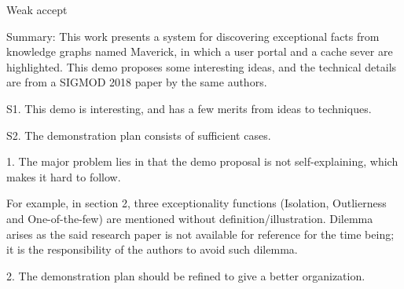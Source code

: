 
Weak accept

Summary: 
This work presents a system for discovering exceptional facts from knowledge graphs named Maverick, in which a user portal and a cache sever are highlighted.
This demo proposes some interesting ideas, and the technical details are from a SIGMOD 2018 paper by the same authors.


S1. This demo is interesting, and has a few merits from ideas to techniques.

S2. The demonstration plan consists of sufficient cases.






1. The major problem lies in that the demo proposal is not self-explaining, which makes it hard to follow.


For example, in section 2, three exceptionality functions (Isolation, Outlierness and One-of-the-few) are mentioned without definition/illustration.
Dilemma arises as the said research paper is not available for reference for the time being; it is the responsibility of the authors to avoid such dilemma.

2. The demonstration plan should be refined to give a better organization. 

